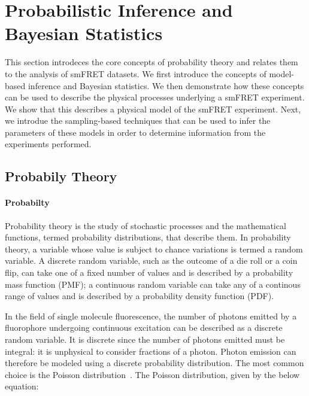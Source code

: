 


\section{Probabilistic Inference and Bayesian Statistics}
This section introdeces the core concepts of probability theory and relates them to the analysis of smFRET datasets. We first introduce the concepts of model-based inference and Bayesian statistics. We then demonstrate how these concepts can be used to describe the physical processes underlying a smFRET experiment. We show that this describes a physical model of the smFRET experiment. Next, we introdue the sampling-based techniques that can be used to infer the parameters of these models in order to determine information from the experiments performed.   

\subsection{Probabily Theory}
\paragraph{Probabilty}
Probability theory is the study of stochastic processes and the mathematical functions, termed probability distributions, that describe them. In probability theory, a variable whose value is subject to chance variations is termed a random variable. A discrete random variable, such as the outcome of a die roll or a coin flip, can take one of a fixed number of values and is described by a probability mass function (PMF); a continuous random variable can take any of a continous range of values and is described by a probability density function (PDF). 

In the field of single molecule fluorescence, the number of photons emitted by a fluorophore undergoing continuous excitation can be described as a discrete random variable. It is discrete since the number of photons emitted must be integral: it is unphysical to consider fractions of a photon. Photon emission can therefore be modeled using a discrete probability distribution. The most common choice is the Poisson distribution~\cite{???}. The Poisson distribution, given by the below equation:

